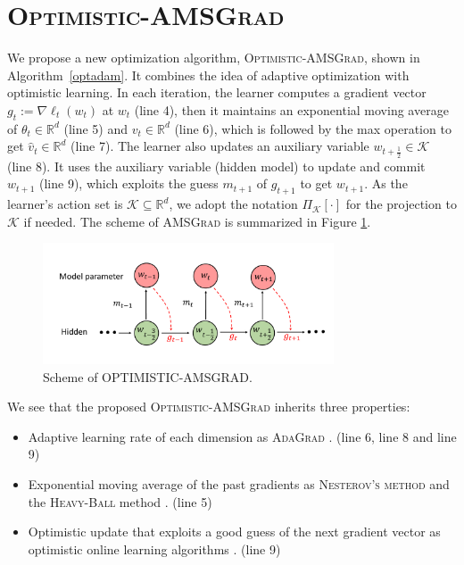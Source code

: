 \documentclass[11pt]{article}
\def\K{\mathcal{K}}
\theoremstyle{k}
\begin{document}
\section{\textsc{Optimistic-AMSGrad}}
We propose a new optimization algorithm,
\textsc{Optimistic-AMSGrad}, shown in Algorithm~\ref{optadam}. It combines the idea of adaptive optimization with optimistic learning. In each iteration, the learner computes a gradient vector $g_{t}:= \nabla \ell_t( w_t)$ at $w_{t}$ (line 4), then it maintains an exponential moving average of $\theta_{t} \in \mathbb R^{d}$ (line 5) and $v_{t} \in \mathbb R^{d}$ (line 6), which is followed by
the max operation to get $\hat{v}_{t} \in \mathbb R^{d}$ (line 7).
The learner also updates an auxiliary variable $w_{t+\frac{1}{2}} \in \K$ (line 8). It uses the auxiliary variable (hidden model) to update and commit $w_{t+1}$ (line 9), which exploits the guess $m_{t+1}$ of $g_{t+1}$ to get $w_{t+1}$.
As the learner's action set is $\K \subseteq \mathbb R^{d}$, we adopt the notation $\Pi_{\K}[\cdot]$ for the projection to $\K$ if needed. The scheme of \textsc{AMSGrad} is summarized in Figure \ref{scheme}.

\begin{figure}[]
    \hspace{-0.15in}
    \includegraphics[width=3.4in]{plot.pdf}
    \caption{Scheme of \textsc{OPTIMISTIC-AMSGRAD}.
     }
     \label{scheme}
\end{figure}

We see that the proposed \textsc{Optimistic-AMSGrad} inherits three properties:
\begin{itemize}
\item Adaptive learning rate of each dimension as \textsc{AdaGrad} \cite{DHS11}. (line 6, line 8 and line 9)
\item Exponential moving average of the past gradients as \textsc{Nesterov's method} \cite{N04} and the \textsc{Heavy-Ball} method \cite{P64}. (line 5)
\item Optimistic update that exploits a good guess of the next gradient vector
as optimistic online learning algorithms \cite{CJ12,RS13,SALS15}. (line 9)
\end{itemize}
\end{document}
